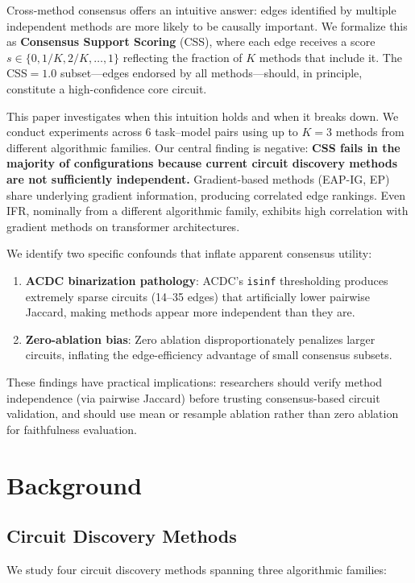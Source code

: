 \documentclass[11pt]{article}
\begin{document}
Cross-method consensus offers an intuitive answer: edges identified by multiple independent methods are more likely to be causally important. We formalize this as \textbf{Consensus Support Scoring} (CSS), where each edge receives a score $s \in \{0, 1/K, 2/K, \ldots, 1\}$ reflecting the fraction of $K$ methods that include it. The CSS$=1.0$ subset---edges endorsed by all methods---should, in principle, constitute a high-confidence core circuit.

This paper investigates when this intuition holds and when it breaks down. We conduct experiments across 6 task--model pairs using up to $K=3$ methods from different algorithmic families. Our central finding is negative: \textbf{CSS fails in the majority of configurations because current circuit discovery methods are not sufficiently independent.} Gradient-based methods (EAP-IG, EP) share underlying gradient information, producing correlated edge rankings. Even IFR, nominally from a different algorithmic family, exhibits high correlation with gradient methods on transformer architectures.

We identify two specific confounds that inflate apparent consensus utility:
\begin{enumerate}
    \item \textbf{ACDC binarization pathology}: ACDC's \texttt{isinf} thresholding produces extremely sparse circuits (14--35 edges) that artificially lower pairwise Jaccard, making methods appear more independent than they are.
    \item \textbf{Zero-ablation bias}: Zero ablation disproportionately penalizes larger circuits, inflating the edge-efficiency advantage of small consensus subsets.
\end{enumerate}

These findings have practical implications: researchers should verify method independence (via pairwise Jaccard) before trusting consensus-based circuit validation, and should use mean or resample ablation rather than zero ablation for faithfulness evaluation.

\section{Background}

\subsection{Circuit Discovery Methods}

We study four circuit discovery methods spanning three algorithmic families:
\end{document}
